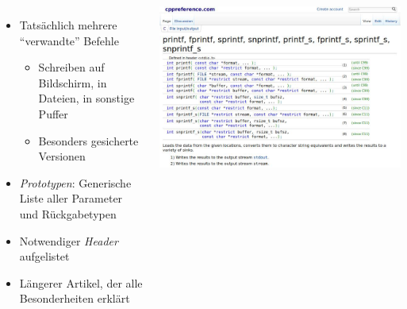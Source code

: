 \begin{frame}
%
\begin{columns}%
\begin{itemize}
\item Tatsächlich mehrere \enquote{verwandte} Befehle
	\begin{itemize}
	\item Schreiben auf Bildschirm, in Dateien, in sonstige Puffer
	\item Besonders gesicherte Versionen
	\end{itemize}
\item \emph{Prototypen}: Generische Liste aller Parameter und Rückgabetypen
\item Notwendiger \emph{Header} aufgelistet
\item Längerer Artikel, der alle Besonderheiten erklärt
\end{itemize}
%
\includegraphics[width=\linewidth]{./gfx/cpp-printf}
\end{columns}
%
\end{frame}


